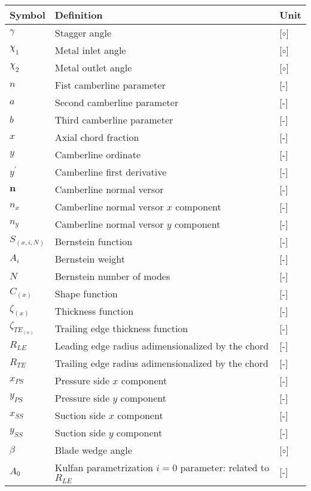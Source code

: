 \documentclass{config/polimiThesis}
\begin{document}
\begin{longtable}{p{2.5cm}p{8cm}p{2.5cm}}
    \hline
    Symbol & Definition & Unit \\
    \hline
    $\gamma$ & Stagger angle & [$\circ$] \\
    $\chi_1$ & Metal inlet angle & [$\circ$] \\
    $\chi_2$ & Metal outlet angle & [$\circ$] \\ 
    $n$ & Fist camberline parameter & [-] \\
    $a$ & Second camberline parameter & [-] \\
    $b$ & Third camberline parameter & [-] \\
    $x$ & Axial chord fraction & [-] \\
    $y$ & Camberline ordinate & [-] \\
    $y^{\prime}$ & Camberline first derivative & [-] \\
    $\boldsymbol{n}$ & Camberline normal versor & [-] \\
    $n_x$ & Camberline normal versor $x$ component & [-] \\
    $n_y$ & Camberline normal versor $y$ component & [-] \\
    $S_{(x, i, N)}$ & Bernstein function & [-] \\
    $A_i$ & Bernstein weight & [-] \\
    $N$ & Bernstein number of modes & [-] \\
    $C_{(x)}$ & Shape function & [-] \\ 
    $\zeta_{(x)}$ & Thickness function & [-] \\ 
    $\zeta_{TE_{(x)}}$ & Trailing edge thickness function & [-] \\
    $R_{LE}$ & Leading edge radius adimensionalized by the chord & [-] \\
    $R_{TE}$ & Trailing edge radius adimensionalized by the chord & [-] \\
    $x_{PS}$ & Pressure side $x$ component & [-] \\
    $y_{PS}$ & Pressure side $y$ component & [-] \\
    $x_{SS}$ & Suction side $x$ component & [-] \\
    $y_{SS}$ & Suction side $y$ component & [-] \\
    $\beta$ & Blade wedge angle & [$\circ$] \\ 
    $A_0$ & Kulfan parametrization $i = 0$ parameter: related to $R_{LE}$ & [-] \\

\end{longtable}
\end{document}
